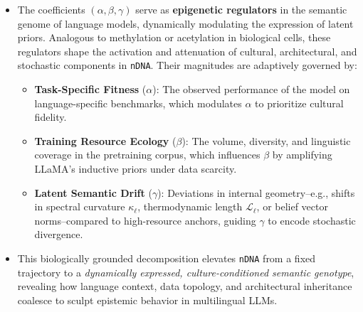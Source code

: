 \begin{itemize}[leftmargin=1.5em]
  \item The coefficients $(\alpha, \beta, \gamma)$ serve as \textbf{epigenetic regulators} in the semantic genome of language models, dynamically modulating the expression of latent priors. Analogous to methylation or acetylation in biological cells, these regulators shape the activation and attenuation of cultural, architectural, and stochastic components in \texttt{nDNA}. Their magnitudes are adaptively governed by:
  \begin{itemize}[leftmargin=1.5em]
    \item \textbf{Task-Specific Fitness} ($\alpha$): The observed performance of the model on language-specific benchmarks, which modulates \(\alpha\) to prioritize cultural fidelity.
    \item \textbf{Training Resource Ecology} ($\beta$): The volume, diversity, and linguistic coverage in the pretraining corpus, which influences \(\beta\) by amplifying LLaMA's inductive priors under data scarcity.
    \item \textbf{Latent Semantic Drift} ($\gamma$): Deviations in internal geometry--e.g., shifts in spectral curvature \(\kappa_\ell\), thermodynamic length \(\mathcal{L}_\ell\), or belief vector norms--compared to high-resource anchors, guiding \(\gamma\) to encode stochastic divergence.
  \end{itemize}

  \item This biologically grounded decomposition elevates \texttt{nDNA} from a fixed trajectory to a \textit{dynamically expressed, culture-conditioned semantic genotype}, revealing how language context, data topology, and architectural inheritance coalesce to sculpt epistemic behavior in multilingual LLMs.
\end{itemize}

